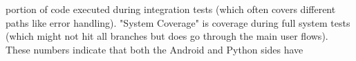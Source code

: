 portion of code executed during integration tests (which often covers different paths like error handling). "System Coverage" is coverage during full system tests (which might not hit all branches but does go through the main user flows). These numbers indicate that both the Android and Python sides have %